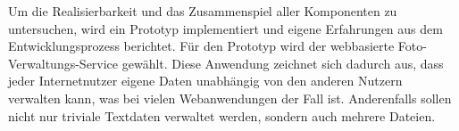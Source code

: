 Um die Realisierbarkeit und das Zusammenspiel aller Komponenten zu untersuchen, wird ein Prototyp implementiert und eigene Erfahrungen aus dem Entwicklungsprozess berichtet. Für den Prototyp wird der webbasierte Foto-Verwaltungs-Service gewählt. Diese Anwendung zeichnet sich dadurch aus, dass jeder Internetnutzer eigene Daten unabhängig von den anderen Nutzern verwalten kann, was bei vielen Webanwendungen der Fall ist. Anderenfalls sollen nicht nur triviale Textdaten verwaltet werden, sondern auch mehrere Dateien.



